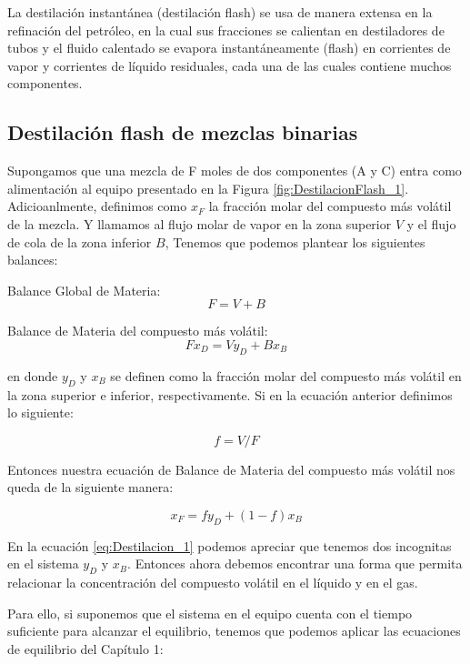\documentclass[11pt]{book}
\begin{document}
La destilación instantánea (destilación flash) se usa de manera extensa en la refinación del petróleo, en la cual sus fracciones se calientan en destiladores de tubos y el fluido calentado se evapora instantáneamente (flash) en corrientes de vapor y corrientes de líquido residuales, cada una de las cuales contiene muchos componentes.

\subsection{Destilación flash de mezclas binarias}

Supongamos que una mezcla de F moles de dos componentes (A y C) entra como alimentación al equipo presentado en la Figura \ref{fig:DestilacionFlash_1}. Adicioanlmente, definimos como $x_F$ la fracción molar del compuesto más volátil de la mezcla. Y llamamos al flujo molar de vapor en la zona superior $V$ y el flujo de cola de la zona inferior $B$, Tenemos que podemos plantear los siguientes balances:

Balance Global de Materia:
\begin{equation}
    \label{eq:Destilacion_0}
    F = V + B
\end{equation}

Balance de Materia del compuesto más volátil:
\begin{equation*}
    Fx_D = Vy_D + Bx_B
\end{equation*}

en donde $y_D$ y $x_B$ se definen como la fracción molar del compuesto más volátil en la zona superior e inferior, respectivamente. Si en la ecuación anterior definimos lo siguiente:

\begin{equation*}
    f = V/F
\end{equation*}

Entonces nuestra ecuación de Balance de Materia del compuesto más volátil nos queda de la siguiente manera:

\begin{equation}
    \label{eq:Destilacion_1}
    x_F = f y_D + (1-f) x_B
\end{equation}

En la ecuación \ref{eq:Destilacion_1} podemos apreciar que tenemos dos incognitas en el sistema $y_D$ y $x_B$. Entonces ahora debemos encontrar una forma que permita relacionar la concentración del compuesto volátil en el líquido y en el gas.

Para ello, si suponemos que el sistema en el equipo cuenta con el tiempo suficiente para alcanzar el equilibrio, tenemos que podemos aplicar las ecuaciones de equilibrio del Capítulo 1:
\end{document}
